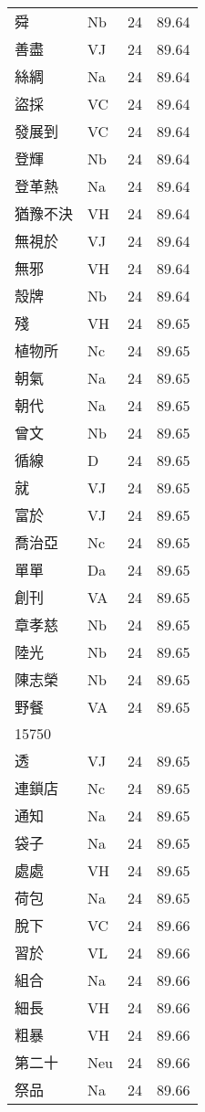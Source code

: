 \documentclass[twocolumn]{book}
\begin{document}
\begin{supertabular}{llrr}
舜 & Nb & 24 &  89.64\\
善盡 & VJ & 24 &  89.64\\
絲綢 & Na & 24 &  89.64\\
盜採 & VC & 24 &  89.64\\
發展到 & VC & 24 &  89.64\\
登輝 & Nb & 24 &  89.64\\
登革熱 & Na & 24 &  89.64\\
猶豫不決 & VH & 24 &  89.64\\
無視於 & VJ & 24 &  89.64\\
無邪 & VH & 24 &  89.64\\
殼牌 & Nb & 24 &  89.64\\
殘 & VH & 24 &  89.65\\
植物所 & Nc & 24 &  89.65\\
朝氣 & Na & 24 &  89.65\\
朝代 & Na & 24 &  89.65\\
曾文 & Nb & 24 &  89.65\\
循線 & D & 24 &  89.65\\
就 & VJ & 24 &  89.65\\
富於 & VJ & 24 &  89.65\\
喬治亞 & Nc & 24 &  89.65\\
單單 & Da & 24 &  89.65\\
創刊 & VA & 24 &  89.65\\
章孝慈 & Nb & 24 &  89.65\\
陸光 & Nb & 24 &  89.65\\
陳志榮 & Nb & 24 &  89.65\\
野餐 & VA & 24 &  89.65\\
15750\\
透 & VJ & 24 &  89.65\\
連鎖店 & Nc & 24 &  89.65\\
通知 & Na & 24 &  89.65\\
袋子 & Na & 24 &  89.65\\
處處 & VH & 24 &  89.65\\
荷包 & Na & 24 &  89.65\\
脫下 & VC & 24 &  89.66\\
習於 & VL & 24 &  89.66\\
組合 & Na & 24 &  89.66\\
細長 & VH & 24 &  89.66\\
粗暴 & VH & 24 &  89.66\\
第二十 & Neu & 24 &  89.66\\
祭品 & Na & 24 &  89.66\\

\end{supertabular}
\end{document}
